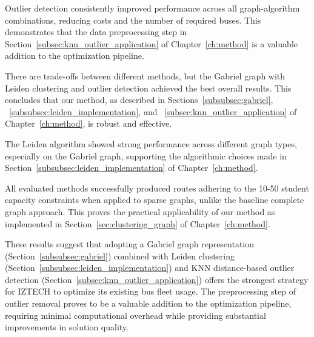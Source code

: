 Outlier detection consistently improved performance across all graph-algorithm combinations, reducing costs and the number of required buses. This demonstrates that the data preprocessing step in Section~\ref{subsec:knn_outlier_application} of Chapter~\ref{ch:method} is a valuable addition to the optimization pipeline.

There are trade-offs between different methods, but the Gabriel graph with Leiden clustering and outlier detection achieved the best overall results. This concludes that our method, as described in Sections~\ref{subsubsec:gabriel}, ~\ref{subsubsec:leiden_implementation}, and ~\ref{subsec:knn_outlier_application} of Chapter~\ref{ch:method}, is robust and effective.

The Leiden algorithm showed strong performance across different graph types, especially on the Gabriel graph, supporting the algorithmic choices made in Section~\ref{subsubsec:leiden_implementation} of Chapter~\ref{ch:method}.

All evaluated methods successfully produced routes adhering to the 10-50 student capacity constraints when applied to sparse graphs, unlike the baseline complete graph approach. This proves the practical applicability of our method as implemented in Section~\ref{sec:clustering_graph} of Chapter~\ref{ch:method}.

These results suggest that adopting a Gabriel graph representation (Section~\ref{subsubsec:gabriel}) combined with Leiden clustering (Section~\ref{subsubsec:leiden_implementation}) and KNN distance-based outlier detection (Section~\ref{subsec:knn_outlier_application}) offers the strongest strategy for IZTECH to optimize its existing bus fleet usage. The preprocessing step of outlier removal proves to be a valuable addition to the optimization pipeline, requiring minimal computational overhead while providing substantial improvements in solution quality.


